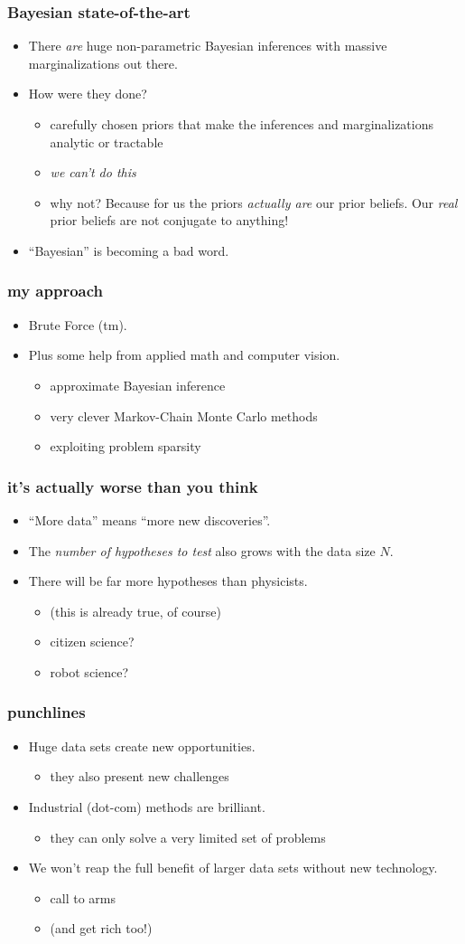 \documentclass[pdftex]{beamer}
\newcommand{\conclusion}{
\begin{frame}
  \frametitle{punchlines}
  \begin{itemize}
  \item Huge data sets create new opportunities.
    \begin{itemize}
    \item they also present new challenges
    \end{itemize}
  \item Industrial (dot-com) methods are brilliant.
    \begin{itemize}
    \item they can only solve a very limited set of problems
    \end{itemize}
  \item We won't reap the full benefit of larger data sets without new technology.
    \begin{itemize}
    \item call to arms
    \item (and get rich too!)
    \end{itemize}
  \end{itemize}
\end{frame}
}
\begin{document}
\begin{frame}
  \frametitle{Bayesian state-of-the-art}
  \begin{itemize}
  \item There \emph{are} huge non-parametric Bayesian inferences with
    massive marginalizations out there.
  \item How were they done?
    \begin{itemize}
    \item carefully chosen priors that make the inferences and
      marginalizations analytic or tractable
    \item \emph{we can't do this}
    \item why not?  Because for us the priors \emph{actually are} our
      prior beliefs.  Our \emph{real} prior beliefs are not conjugate
      to anything!
    \end{itemize}
  \item ``Bayesian'' is becoming a bad word.
  \end{itemize}
\end{frame}

\begin{frame}
  \frametitle{my approach}
  \begin{itemize}
  \item<2-> Brute Force (tm).
  \item<3-> Plus some help from applied math and computer vision.
    \begin{itemize}
    \item approximate Bayesian inference
    \item very clever Markov-Chain Monte Carlo methods
    \item exploiting problem sparsity
    \end{itemize}
  \end{itemize}
\end{frame}

\begin{frame}
  \frametitle{it's actually worse than you think}
  \begin{itemize}
  \item ``More data'' means ``more new discoveries''.
  \item The \emph{number of hypotheses to test} also grows with the data size $N$.
  \item There will be far more hypotheses than physicists.
    \begin{itemize}
    \item (this is already true, of course)
    \item citizen science?
    \item robot science?
    \end{itemize}
  \end{itemize}
\end{frame}

\conclusion
\end{document}
